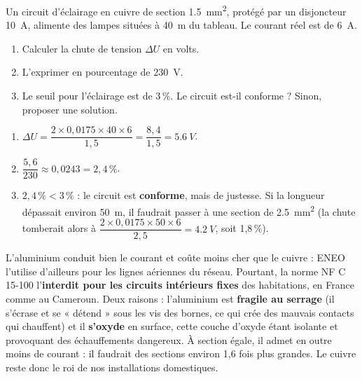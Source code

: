 \documentclass[11pt]{article}
\begin{document}
\begin{exercice}
Un circuit d'éclairage en cuivre de section \SI{1,5}{mm^2}, protégé par un disjoncteur \SI{10}{A}, alimente des lampes situées à \SI{40}{m} du tableau. Le courant réel est de \SI{6}{A}.
\begin{enumerate}
\item Calculer la chute de tension $\Delta U$ en volts.
\item L'exprimer en pourcentage de \SI{230}{V}.
\item Le seuil pour l'éclairage est de 3\,\%. Le circuit est-il conforme ? Sinon, proposer une solution.
\end{enumerate}
\end{exercice}

\begin{corrige}
\begin{enumerate}
\item $\Delta U = \dfrac{2 \times 0{,}0175 \times 40 \times 6}{1{,}5} = \dfrac{8{,}4}{1{,}5} = \SI{5,6}{V}$.
\item $\dfrac{5{,}6}{230} \approx 0{,}0243 = 2{,}4\,\%$.
\item $2{,}4\,\% < 3\,\%$ : le circuit est \textbf{conforme}, mais de justesse. Si la longueur dépassait environ \SI{50}{m}, il faudrait passer à une section de \SI{2,5}{mm^2} (la chute tomberait alors à $\dfrac{2 \times 0{,}0175 \times 50 \times 6}{2{,}5} = \SI{4,2}{V}$, soit 1,8\,\%).
\end{enumerate}
\end{corrige}

\begin{savaistu}
L'aluminium conduit bien le courant et coûte moins cher que le cuivre : ENEO l'utilise d'ailleurs pour les lignes aériennes du réseau. Pourtant, la norme NF C 15-100 l'\textbf{interdit pour les circuits intérieurs fixes} des habitations, en France comme au Cameroun. Deux raisons : l'aluminium est \textbf{fragile au serrage} (il s'écrase et se « détend » sous les vis des bornes, ce qui crée des mauvais contacts qui chauffent) et il \textbf{s'oxyde} en surface, cette couche d'oxyde étant isolante et provoquant des échauffements dangereux. À section égale, il admet en outre moins de courant : il faudrait des sections environ 1,6 fois plus grandes. Le cuivre reste donc le roi de nos installations domestiques.
\end{savaistu}
\end{document}
